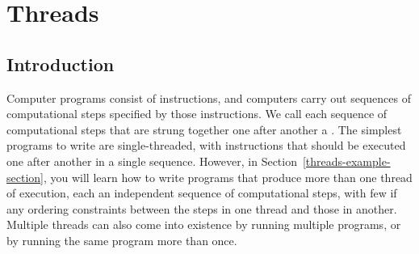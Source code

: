 \chapter{Threads}
\label{threads-chapter}
\section{Introduction}
Computer programs consist of instructions, and computers carry out
sequences of computational steps specified by those instructions.  We
call each sequence of computational steps that are strung together one after
another a .  The simplest programs to write are
single-threaded, with instructions that should be executed one after
another in a single sequence.  However, in
Section~\ref{threads-example-section}, you will learn how to write
programs that produce more than one thread of execution, each an
independent sequence of computational steps, with few if any
ordering constraints between the steps in one thread and those in
another.  Multiple threads can also come into existence by running
multiple programs, or by running the same program more than once.

